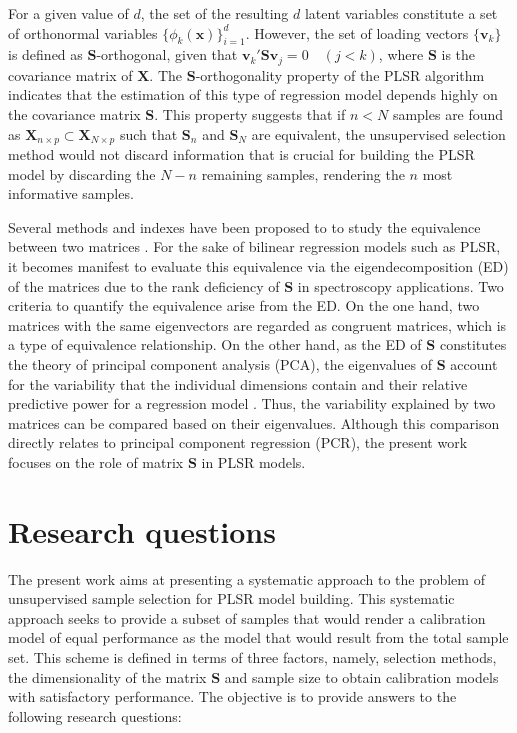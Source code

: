 \documentclass[journal=ancham,manuscript=article]{achemso}
\begin{document}
For a given value of $d$, the set of the resulting $d$ latent variables constitute a set of orthonormal variables $\{\phi_{k}(\mathbf{x})\}_{i=1}^d$. However, the set of loading vectors $\{\mathbf{v}_k\}$ is defined as $\mathbf{S}$-orthogonal, given that $\mathbf{v}_k'\mathbf{S}\mathbf{v}_j = 0 \quad (j<k)$, where $\mathbf{S}$ is the covariance matrix of $\mathbf{X}$. The $\mathbf{S}$-orthogonality property of the PLSR algorithm indicates that the estimation of this type of regression model depends highly on the covariance matrix $\mathbf{S}$. This property suggests that if $n<N$ samples are found as $\mathbf{X}_{n \times p} \subset \mathbf{X}_{N \times p}$ such that $\mathbf{S}_n$ and $\mathbf{S}_N$ are equivalent, the unsupervised selection method would not discard information that is crucial for building the PLSR model by discarding the $N-n$ remaining samples, rendering the $n$ most informative samples.

Several methods and indexes have been proposed to to study the equivalence between two matrices \cite{Tomic2013}. For the sake of bilinear regression models such as PLSR, it becomes manifest to evaluate this equivalence via the eigendecomposition (ED) of the matrices due to the rank deficiency of $\mathbf{S}$ in spectroscopy applications. Two criteria to quantify the equivalence arise from the ED. On the one hand, two matrices with the same eigenvectors are regarded as congruent matrices, which is a type of equivalence relationship\cite{Horn1985}. On the other hand, as the ED of $\mathbf{S}$ constitutes the theory of principal component analysis (PCA), the eigenvalues of $\mathbf{S}$ account for the variability that the individual dimensions contain and their relative predictive power for a regression model \cite{Artemiou2013}. Thus, the variability explained by two matrices can be compared based on their eigenvalues. Although this comparison directly relates to principal component regression (PCR), the present work focuses on the role of matrix $\mathbf{S}$ in PLSR models.


\section{Research questions}

The present work aims at presenting a systematic approach to the problem of unsupervised sample selection for PLSR model building. This systematic approach seeks to provide a subset of samples that would render a calibration model of equal performance as the model that would result from the total sample set. This scheme is defined in terms of three factors, namely, selection methods, the dimensionality of the matrix $\mathbf{S}$ and sample size to obtain calibration models with satisfactory performance. The objective is to provide answers to the following research questions:
\end{document}
